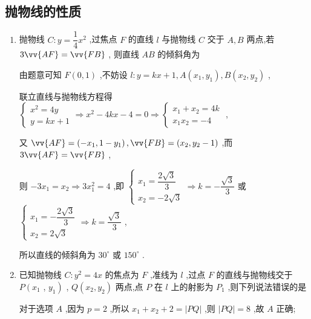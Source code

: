\subsection*{抛物线的性质}
\begin{enumerate}
    \item 抛物线 $C : y = \dfrac{1}{4}{x}^{2}$ ,过焦点 $F$ 的直线 $l$ 与抛物线 $C$ 交于 $A,B$ 两点,若 $3\vv{AF} = \vv{FB}$ , 则直线 ${AB}$ 的倾斜角为
    \begin{jieda}
        由题意可知 $F\left( {0,1}\right)$ ,不妨设 $l : y = {kx} + 1,A\left( {{x}_{1},{y}_{1}}\right) ,B\left( {{x}_{2},{y}_{2}}\right)$ ,
        
        联立直线与抛物线方程得 $\left\{  \begin{array}{l} {x}^{2} = {4y} \\  y = {kx} + 1 \end{array} \Longrightarrow  {x}^{2} - {4kx} - 4 = 0 \Longrightarrow  \left \{\begin{array}{l}
             {x}_{1} + {x}_{2} = {4k}  \\
             {x}_{1}{x}_{2} =  - 4
        \end{array}\right. \right.$ ,
        
        又 $\vv{AF} = \left( {-{x}_{1},1 - {y}_{1}}\right) ,\vv{FB} = \left( {{x}_{2},{y}_{2} - 1}\right)$ ,而 $3\vv{AF} = \vv{FB}$ ,
        
        则 $- 3{x}_{1} = {x}_{2} \Longrightarrow  3{x}_{1}^{2} = 4$ ,即 $\left\{  {\begin{array}{l} {x}_{1} = \dfrac{2\sqrt{3}}{3} \\  {x}_{2} =  - 2\sqrt{3} \end{array} \Longrightarrow  k =  - \dfrac{\sqrt{3}}{3}}\right.$ 或 $\left\{  {\begin{array}{l} {x}_{1} =  - \dfrac{2\sqrt{3}}{3} \\  {x}_{2} = 2\sqrt{3} \end{array} \Longrightarrow  k = \dfrac{\sqrt{3}}{3}}\right.$ ,
        
        所以直线的倾斜角为 ${30}^{ \circ  }$ 或 ${150}^{ \circ  }$ .
    \end{jieda}
    
    \item 已知抛物线 $C : {y}^{2} = {4x}$ 的焦点为 $F$ ,准线为 $l$ ,过点 $F$ 的直线与抛物线交于 $P\left( {x}_{1}\right.$ , $\left. {y}_{1}\right)$ , $Q\left( {{x}_{2},{y}_{2}}\right)$ 两点,点 $P$ 在 $l$ 上的射影为 ${P}_{1}$ ,则下列说法错误的是
    \begin{jieda}
        对于选项 ${A}$ ,因为 $p = 2$ ,所以 ${x}_{1} + {x}_{2} + 2 = \left| {PQ}\right|$ ,则 $\left| {PQ}\right|  = 8$ ,故 ${A}$ 正确;
        

\end{jieda}
\end{enumerate}
